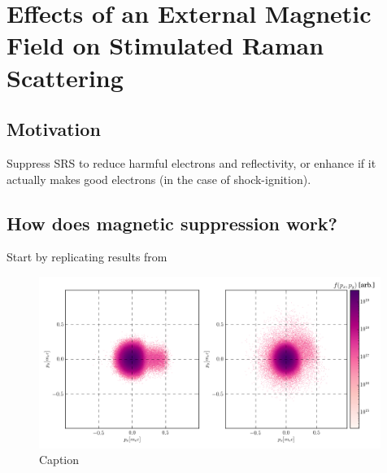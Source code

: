 \chapter{Effects of an External Magnetic Field on Stimulated Raman Scattering}
\label{chp:magSRS}

\section{Motivation}

Suppress SRS to reduce harmful electrons and reflectivity, or enhance if it actually makes good electrons (in the case of shock-ignition).

\section{How does magnetic suppression work?}

Start by replicating results from \cite{Winjum2018}

\begin{figure}
    \centering
    \includegraphics[width=0.99\textwidth]{Chapters/C5_magSRS/best_px_py_compare.png}
    \caption{Caption}
    \label{fig:my_label}
\end{figure}{}